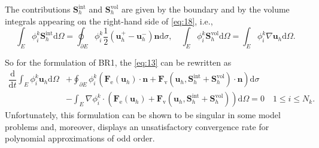 \documentclass{develop-note}
\begin{document}
The contributions $\mathbf{S}_{h}^{\mathrm{int}}$ and $\mathbf{S}_{h}^{\mathrm{vol}}$ are given by the boundary and by the volume integrals appearing on the right-hand side of \autoref{eq:18}, i.e.,
\begin{equation}
  \int_{E}\phi_{i}^{k}\mathbf{S}_{h}^{\mathrm{int}}\mathrm{d}\Omega=\oint_{\partial E}\phi_{i}^{k}\dfrac{1}{2}(\mathbf{u}_{h}^{+}-\mathbf{u}_{h}^{-})\mathbf{n}\mathrm{d}\sigma,\quad \int_{E}\phi_{i}^{k}\mathbf{S}_{h}^{\mathrm{vol}}\mathrm{d}\Omega=\int_{E}\phi_{i}^{k}\nabla\mathbf{u}_{h}\mathrm{d}\Omega.
\end{equation}

So for the formulation of BR1, the \autoref{eq:13} can be rewritten as
\begin{equation}
  \label{eq:20}
  \begin{aligned}
    \dfrac{\mathrm{d}}{\mathrm{d}t}\int_{E}\phi_{i}^{k}\mathbf{u}_{h}\mathrm{d}\Omega &+\oint_{\partial E}\phi_{i}^{k}(\mathbf{F}_{\mathrm{e}}(\mathbf{u}_{h})\cdot\mathbf{n}+\mathbf{F}_{\mathrm{v}}(\mathbf{u}_{h},\mathbf{S}_{h}^{\mathrm{int}}+\mathbf{S}_{h}^{\mathrm{vol}})\cdot\mathbf{n})\mathrm{d}\sigma\\
    &-\int_{E}\nabla\phi_{i}^{k}\cdot(\mathbf{F}_{\mathrm{e}}(\mathbf{u}_{h})+\mathbf{F}_{\mathrm{v}}(\mathbf{u}_{h},\mathbf{S}_{h}^{\mathrm{int}}+\mathbf{S}_{h}^{\mathrm{vol}}))\mathrm{d}\Omega=0\quad 1\leqslant i\leqslant N_{k}.
  \end{aligned}
\end{equation}
Unfortunately, this formulation can be shown to be singular in some model problems and, moreover, displays an unsatisfactory convergence rate for polynomial approximations of odd order.
\end{document}
